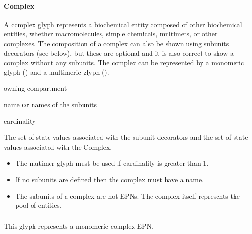 

\paragraph{Complex}\label{sec:complex}

A complex glyph represents a biochemical entity composed of other
biochemical entities, whether macromolecules, simple chemicals,
multimers, or other complexes. The composition of a complex can also
be shown using subunits decorators (see below), but these are optional
and it is also correct to show a complex without any subunits. The
complex can be represented by a monomeric glyph () and a multimeric glyph ().

\begin{glyphDescription}
\begin{glyphIdentity}
  \item owning compartment
  \item name \textbf{or} names of the subunits 
  \item cardinality
  \item The set of state values associated with the subunit decorators
    and the set of state values associated with the Complex.
  \end{glyphIdentity}
\glyphRules
\begin{itemize}
  \item The mutimer glyph must be used if cardinality is greater than
    1.
  \item If no subunits are defined then the complex must have a name.
  \item The subunits of a complex are not EPNs. The complex itself
    represents the pool of entities.
\end{itemize}
\end{glyphDescription}


\subparagraph{}

This glyph represents a monomeric complex EPN.

